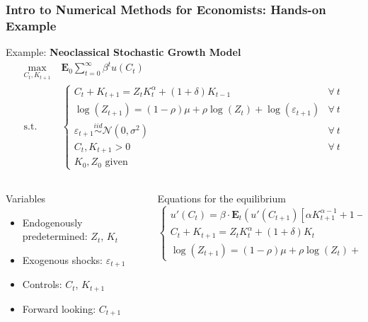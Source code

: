 \documentclass[10pt, aspectratio=1610, handout]{beamer}
\newcommand{\E}{\mathbf{E}}
\begin{document}
  \begin{frame}
    \frametitle{Intro to Numerical Methods for Economists: Hands-on Example}

    Example: \textbf{Neoclassical Stochastic Growth Model}
    \begin{align*}
      \max_{C_t, K_{t+1}} &\; \E_0 \sum_{t=0}^{\infty} \beta^t u(C_t) \\
      \text{s.t.} &\; \begin{cases}
        C_t + K_{t+1} = Z_t K_t^\alpha + (1 + \delta) K_{t-1} &\forall\ t\\
        \log(Z_{t+1}) = (1-\rho) \mu + \rho \log(Z_t) + \log(\varepsilon_{t+1}) &\forall\ t\\
        \varepsilon_{t+1} \overset{iid}{\sim} \mathcal{N}(0, \sigma^2) &\forall\ t\\
        C_t, K_{t+1} > 0 &\forall\ t\\
        K_{0}, Z_{0} \text{ given}
      \end{cases}
    \end{align*}

    \vfill\pause

    \begin{columns}[T]
      \begin{column}{0.475\textwidth}
        Variables
        \begin{itemize}
          \item Endogenously predetermined: $Z_t$, $K_t$
          \item Exogenous shocks: $\varepsilon_{t+1}$
          \item Controls: $C_t$, $K_{t+1}$
          \item Forward looking: $C_{t+1}$
        \end{itemize}
      \end{column}
      \begin{column}{0.475\textwidth}
        Equations for the equilibrium
        \begin{equation*}
          \begin{cases}
            u'(C_t) = \beta \cdot \E_t \left( u'(C_{t+1}) \left[ \alpha K_{t+1}^{\alpha-1} + 1 - \delta \right] \right) \\
            C_t + K_{t+1} = Z_t K_t^\alpha + (1 + \delta) K_t  \\
            \log(Z_{t+1}) = (1-\rho) \mu + \rho \log(Z_t) + \log(\varepsilon_{t+1})
          \end{cases}
        \end{equation*}
      \end{column}
    \end{columns}

  \end{frame}
\end{document}
